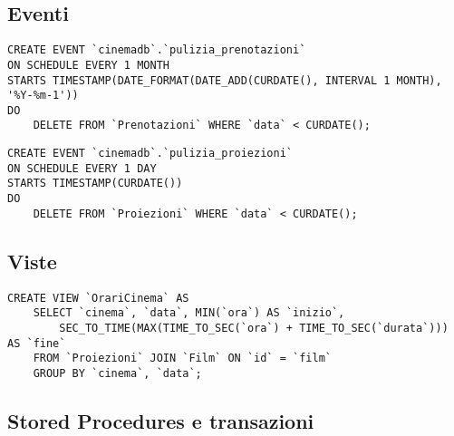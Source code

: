 \pagebreak
\subsection*{Eventi}
%
%
\begin{verbatim}
CREATE EVENT `cinemadb`.`pulizia_prenotazioni`
ON SCHEDULE EVERY 1 MONTH
STARTS TIMESTAMP(DATE_FORMAT(DATE_ADD(CURDATE(), INTERVAL 1 MONTH), '%Y-%m-1'))
DO
    DELETE FROM `Prenotazioni` WHERE `data` < CURDATE();
\end{verbatim}

\begin{verbatim}
CREATE EVENT `cinemadb`.`pulizia_proiezioni`
ON SCHEDULE EVERY 1 DAY
STARTS TIMESTAMP(CURDATE())
DO
    DELETE FROM `Proiezioni` WHERE `data` < CURDATE();
\end{verbatim}
    
\subsection*{Viste}
%
%

\begin{verbatim}
CREATE VIEW `OrariCinema` AS
    SELECT `cinema`, `data`, MIN(`ora`) AS `inizio`,
        SEC_TO_TIME(MAX(TIME_TO_SEC(`ora`) + TIME_TO_SEC(`durata`))) AS `fine`
    FROM `Proiezioni` JOIN `Film` ON `id` = `film`
    GROUP BY `cinema`, `data`;
\end{verbatim}

\subsection*{Stored Procedures e transazioni}
%
%
